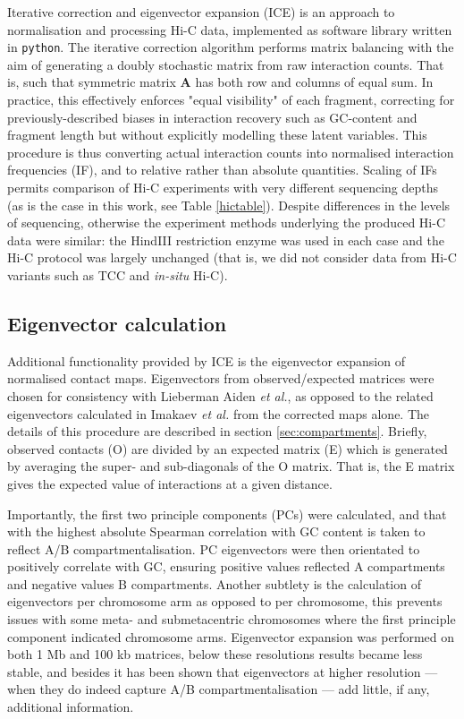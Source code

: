\documentclass[a4paper,11pt,oneside]{book}
\begin{document}
Iterative correction and eigenvector expansion (ICE) is an approach to normalisation and processing Hi-C data, implemented as software library written in \texttt{python}.\citep{Imakaev2012} The iterative correction algorithm performs matrix balancing with the aim of generating a doubly stochastic matrix from raw interaction counts.\cite{Lajoie2014} That is, such that symmetric matrix $\mathbf{A}$ has both row and columns of equal sum. In practice, this effectively enforces "equal visibility" of each fragment, correcting for previously-described biases in interaction recovery such as GC-content and fragment length\cite{Yaffe2011} but without explicitly modelling these latent variables. This procedure is thus converting actual interaction counts into normalised interaction frequencies (IF), and to relative rather than absolute quantities. Scaling of IFs permits comparison of Hi-C experiments with very different sequencing depths (as is the case in this work, see Table \ref{hictable}). Despite differences in the levels of sequencing, otherwise the experiment methods underlying the produced Hi-C data were similar: the HindIII restriction enzyme was used in each case and the Hi-C protocol was largely unchanged (that is, we did not consider data from Hi-C variants such as TCC\cite{Kalhor2012} and \emph{in-situ} Hi-C\cite{Rao2014}).

\subsection{Eigenvector calculation}\label{sec:eigs}
Additional functionality provided by ICE is the eigenvector expansion of normalised contact maps. Eigenvectors from observed/expected matrices were chosen for consistency with Lieberman Aiden \emph{et al.},\cite{Lieberman2009} as opposed to the related eigenvectors calculated in Imakaev \emph{et al.}\cite{Imakaev2012} from the corrected maps alone. The details of this procedure are described in section \ref{sec:compartments}. Briefly, observed contacts (O) are divided by an expected matrix (E) which is generated by averaging the super- and sub-diagonals of the O matrix. That is, the E matrix gives the expected value of interactions at a given distance.

Importantly, the first two principle components (PCs) were calculated, and that with the highest absolute Spearman correlation with GC content is taken to reflect A/B compartmentalisation. PC eigenvectors were then orientated to positively correlate with GC, ensuring positive values reflected A compartments and negative values B compartments. Another subtlety is the calculation of eigenvectors per chromosome arm as opposed to per chromosome, this prevents issues with some meta- and submetacentric chromosomes where the first principle component indicated chromosome arms.\cite{Lieberman2009, Imakaev2012} Eigenvector expansion was performed on both 1 Mb and 100 kb matrices, below these resolutions results became less stable, and besides it has been shown that eigenvectors at higher resolution --- when they do indeed capture A/B compartmentalisation --- add little, if any, additional information.
\end{document}
